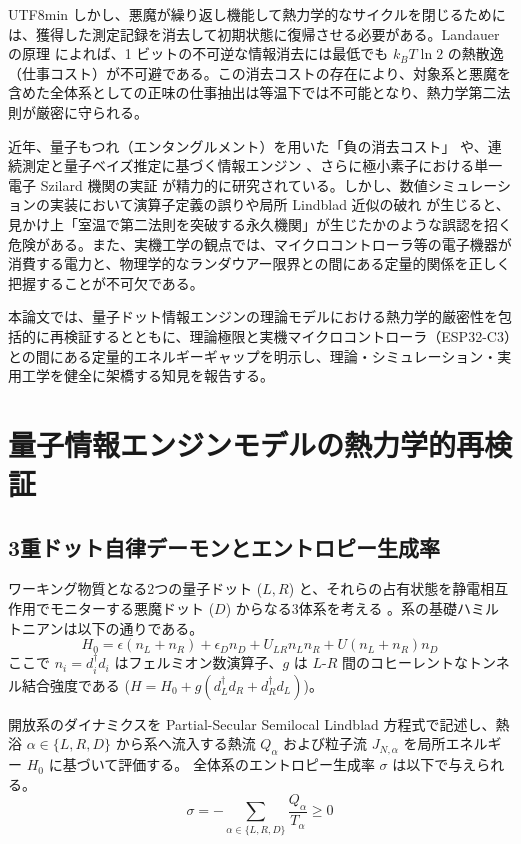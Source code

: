 \documentclass[a4paper,11pt,twocolumn]{article}
\begin{document}
\begin{CJK*}{UTF8}{min}
しかし、悪魔が繰り返し機能して熱力学的なサイクルを閉じるためには、獲得した測定記録を消去して初期状態に復帰させる必要がある。Landauer の原理 \cite{landauer1961irreversibility, bennett1982thermodynamics} によれば、1 ビットの不可逆な情報消去には最低でも $k_B T \ln 2$ の熱散逸（仕事コスト）が不可避である。この消去コストの存在により、対象系と悪魔を含めた全体系としての正味の仕事抽出は等温下では不可能となり、熱力学第二法則が厳密に守られる。

近年、量子もつれ（エンタングルメント）を用いた「負の消去コスト」\cite{delrio2011thermodynamic} や、連続測定と量子ベイズ推定に基づく情報エンジン \cite{koski2014experimental, strasberg2017quantum}、さらに極小素子における単一電子 Szilard 機関の実証 \cite{koski2014experimental, berut2012experimental} が精力的に研究されている。しかし、数値シミュレーションの実装において演算子定義の誤りや局所 Lindblad 近似の破れ \cite{levy2014local} が生じると、見かけ上「室温で第二法則を突破する永久機関」が生じたかのような誤認を招く危険がある。また、実機工学の観点では、マイクロコントローラ等の電子機器が消費する電力と、物理学的なランダウアー限界との間にある定量的関係を正しく把握することが不可欠である。

本論文では、量子ドット情報エンジンの理論モデルにおける熱力学的厳密性を包括的に再検証するとともに、理論極限と実機マイクロコントローラ（ESP32-C3）との間にある定量的エネルギーギャップを明示し、理論・シミュレーション・実用工学を健全に架橋する知見を報告する。

\section{量子情報エンジンモデルの熱力学的再検証}

\subsection{3重ドット自律デーモンとエントロピー生成率}
ワーキング物質となる2つの量子ドット ($L, R$) と、それらの占有状態を静電相互作用でモニターする悪魔ドット ($D$) からなる3体系を考える \cite{schaller2014open}。系の基礎ハミルトニアンは以下の通りである。
\begin{equation}
H_0 = \epsilon (n_L + n_R) + \epsilon_D n_D + U_{LR} n_L n_R + U (n_L + n_R) n_D
\end{equation}
ここで $n_i = d_i^\dagger d_i$ はフェルミオン数演算子、$g$ は $L$-$R$ 間のコヒーレントなトンネル結合強度である ($H = H_0 + g(d_L^\dagger d_R + d_R^\dagger d_L)$)。

開放系のダイナミクスを Partial-Secular Semilocal Lindblad 方程式で記述し、熱浴 $\alpha \in \{L, R, D\}$ から系へ流入する熱流 $Q_\alpha$ および粒子流 $J_{N,\alpha}$ を局所エネルギー $H_0$ に基づいて評価する。
全体系のエントロピー生成率 $\sigma$ は以下で与えられる。
\begin{equation}
\sigma = -\sum_{\alpha \in \{L, R, D\}} \frac{Q_\alpha}{T_\alpha} \ge 0
\end{equation}


\end{CJK*}
\end{document}
